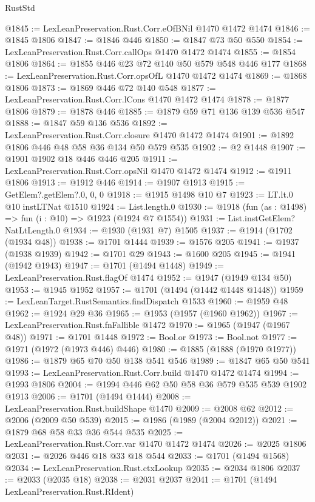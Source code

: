 \begin{lexlean}{RustStd}
\begin{coremodule}
{\begin{coremodule}
{{{{{{{{{{{{{@1845 := LexLeanPreservation.Rust.Corr.eOfBNil @1470 @1472 @1474
@1846 := @1845 @1806
@1847 := @1846 @446
@1850 := @1847 @73 @50 @550
@1854 := LexLeanPreservation.Rust.Corr.callOps @1470 @1472 @1474
@1855 := @1854 @1806
@1864 := @1855 @446 @23 @72 @140 @50 @579 @548 @446 @177
@1868 := LexLeanPreservation.Rust.Corr.opsOfL @1470 @1472 @1474
@1869 := @1868 @1806
@1873 := @1869 @446 @72 @140 @548
@1877 := LexLeanPreservation.Rust.Corr.lCons @1470 @1472 @1474
@1878 := @1877 @1806
@1879 := @1878 @446
@1885 := @1879 @59 @71 @136 @139 @536 @547
@1888 := @1847 @59 @136 @536
@1892 := LexLeanPreservation.Rust.Corr.closure @1470 @1472 @1474
@1901 := @1892 @1806 @446 @48 @58 @36 @134 @50 @579 @535
@1902 := @2 @1448
@1907 := @1901 @1902 @18 @446 @446 @205
@1911 := LexLeanPreservation.Rust.Corr.opsNil @1470 @1472 @1474
@1912 := @1911 @1806
@1913 := @1912 @446
@1914 := @1907 @1913
@1915 := GetElem?.getElem?.{0, 0, 0}
@1918 := @1915 @1498 @10 @7
@1923 := LT.lt.{0} @10 instLTNat @1510
@1924 := List.length.{0}
@1930 := @1918 (fun (as : @1498) => fun (i : @10) => @1923 (@1924 @7 @1554))
@1931 := List.instGetElem?NatLtLength.{0}
@1934 := @1930 (@1931 @7) @1505
@1937 := @1914 (@1702 (@1934 @48))
@1938 := @1701 @1444
@1939 := @1576 @205
@1941 := @1937 (@1938 @1939)
@1942 := @1701 @29
@1943 := @1600 @205
@1945 := @1941 (@1942 @1943)
@1947 := @1701 (@1494 @1448)
@1949 := LexLeanPreservation.Rust.flagOf @1474
@1952 := @1947 (@1949 @134 @50)
@1953 := @1945 @1952
@1957 := @1701 (@1494 (@1442 @1448 @1448))
@1959 := LexLeanTarget.RustSemantics.findDispatch @1533
@1960 := @1959 @48
@1962 := @1924 @29 @36
@1965 := @1953 (@1957 (@1960 @1962))
@1967 := LexLeanPreservation.Rust.fnFallible @1472
@1970 := @1965 (@1947 (@1967 @48))
@1971 := @1701 @1448
@1972 := Bool.or
@1973 := Bool.not
@1977 := @1971 (@1972 (@1973 @446) @446)
@1980 := @1885 (@1888 (@1970 @1977))
@1986 := @1879 @65 @70 @50 @138 @541 @546
@1989 := @1847 @65 @50 @541
@1993 := LexLeanPreservation.Rust.Corr.build @1470 @1472 @1474
@1994 := @1993 @1806
@2004 := @1994 @446 @62 @50 @58 @36 @579 @535 @539 @1902 @1913
@2006 := @1701 (@1494 @1444)
@2008 := LexLeanPreservation.Rust.buildShape @1470
@2009 := @2008 @62
@2012 := @2006 (@2009 @50 @539)
@2015 := @1986 (@1989 (@2004 @2012))
@2021 := @1879 @68 @58 @33 @36 @544 @535
@2025 := LexLeanPreservation.Rust.Corr.var @1470 @1472 @1474
@2026 := @2025 @1806
@2031 := @2026 @446 @18 @33 @18 @544
@2033 := @1701 (@1494 @1568)
@2034 := LexLeanPreservation.Rust.ctxLookup
@2035 := @2034 @1806
@2037 := @2033 (@2035 @18)
@2038 := @2031 @2037
@2041 := @1701 (@1494 LexLeanPreservation.Rust.RIdent)
}}}}}}}}}}}}}
\end{coremodule}}
\end{coremodule}
\end{lexlean}

